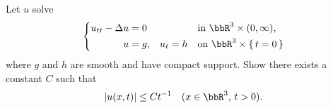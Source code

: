 \begin{problem}
  Let \(u\) solve
  \[
    \left\{
      \begin{aligned}
        u_{tt}-\Delta u&=0&&&&\text{in \(\bbR^3\times(0,\infty)\),}\\
        u&=g,&u_t&=h&&\text{on \(\bbR^3\times\{\,t=0\,\}\)}
      \end{aligned}
    \right.
  \]
  where \(g\) and \(h\) are smooth and have compact support. Show there
  exists a constant \(C\) such that
  \[
    |u(x,t)|\leq Ct^{-1}\quad(x\in\bbR^3,\,t>0).
  \]
\end{problem}
\begin{solution}
\end{solution}

